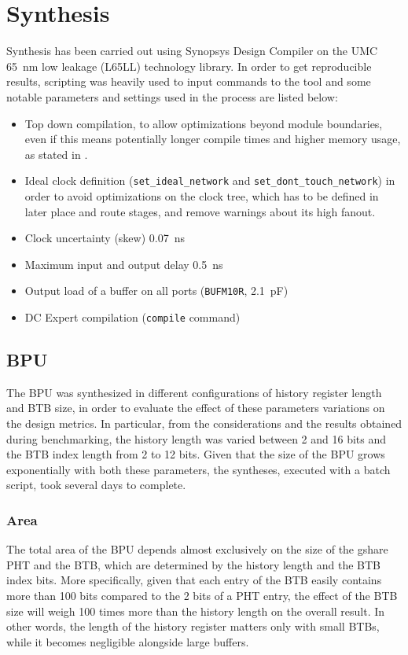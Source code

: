 \section{Synthesis}
Synthesis has been carried out using Synopsys Design Compiler on the UMC \SI{65}{nm} low leakage (L65LL) technology library. In order to get reproducible results, scripting was heavily used to input commands to the tool and some notable parameters and settings used in the process are listed below:
\begin{itemize}
  \item Top down compilation, to allow optimizations beyond module boundaries, even if this means potentially longer compile times and higher memory usage, as stated in \cite[p.8-6]{dc}.
  \item Ideal clock definition (\texttt{set\_ideal\_network} and \texttt{set\_dont\_touch\_network}) in order to avoid optimizations on the clock tree, which has to be defined in later place and route stages, and remove warnings about its high fanout.
  \item Clock uncertainty (skew) \SI{0.07}{ns}
  \item Maximum input and output delay \SI{0.5}{ns}
  \item Output load of a buffer on all ports (\texttt{BUFM10R}, \SI{2.1}{\pico\farad})
  \item DC Expert compilation (\texttt{compile} command)
\end{itemize}

\subsection{\acs{BPU}}
The \ac{BPU} was synthesized in different configurations of history register length and \ac{BTB} size, in order to evaluate the effect of these parameters variations on the design metrics. In particular, from the considerations and the results obtained during benchmarking, the history length was varied between 2 and 16 bits and the \ac{BTB} index length from 2 to 12 bits. Given that the size of the \ac{BPU} grows exponentially with both these parameters, the syntheses, executed with a batch script, took several days to complete.

\subsubsection{Area}
The total area of the \ac{BPU} depends almost exclusively on the size of the gshare \ac{PHT} and the \ac{BTB}, which are determined by the history length and the \ac{BTB} index bits. More specifically, given that each entry of the \ac{BTB} easily contains more than 100 bits compared to the 2 bits of a \ac{PHT} entry, the effect of the \ac{BTB} size will weigh 100 times more than the history length on the overall result. In other words, the length of the history register matters only with small \acp{BTB}, while it becomes negligible alongside large buffers.

